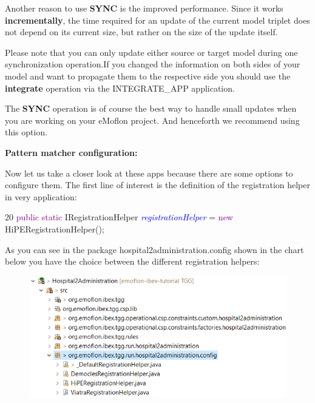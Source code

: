 Another reason to use \textbf{SYNC} is the improved performance. Since it works \textbf{incrementally}, the time required for an update of the current model triplet does not depend on its current size, but rather on the size of the update itself. 

Please note that you can only update either source or target model during one synchronization operation.If you changed the information on both sides of your model and want to propagate them to the respective side you should use the \textbf{integrate} operation via the \textsf{INTEGRATE\_APP} application. 

The \textbf{SYNC} operation is of course the best way to handle small updates when you are working on your eMoflon project. And henceforth we recommend using this option.\newline

\textbf{Pattern matcher configuration:}

Now let us take a closer look at these apps because there are some options to configure them.
The first line of interest is the definition of the registration helper in very application:\newline

20\hspace{0.5cm} \textcolor{Purple}{public static} IRegistrationHelper \textcolor{Blue}{\textit{registrationHelper}} = \textcolor{Purple}{new} HiPERegistrationHelper();\newline

As you can see in the package \textsf{hospital2administration.config} shown in the chart below you have the choice between the different registration helpers:\newline

\begin{figure}[h]
    \centering
    \includegraphics[scale=0.65 ]{pictures/registrationHelpers.png}
    \caption{}
    \label{setDefaultNumber}
\end{figure}

